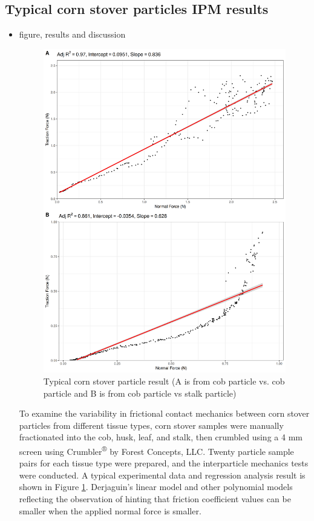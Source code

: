 \documentclass[xcolor=dvipsnames,10pt,hidelinks]{article}
\let\oldsubsection\subsection
\renewcommand{\subsection}{\clearpage\oldsubsection}
\begin{document}
\subsection{Typical corn stover particles IPM results}
\label{sec:orgc09d15c}
\begin{itemize}
\item figure, results and discussion
\label{sec:orga36996c}

\begin{figure}[!htb]
\centering
\includegraphics[width=.9\linewidth]{./figures/typical_result_cs_two_cases.png}
\caption{\label{fig:org97719c9}Typical corn stover particle result (A is from cob particle vs. cob particle and B is from cob particle vs stalk particle)}
\end{figure}

To examine the variability in frictional contact mechanics between corn stover particles from different tissue types, corn stover samples were manually fractionated into the cob, husk, leaf, and stalk, then crumbled using a 4 mm screen using Crumbler\textsuperscript{®} by Forest Concepts, LLC. Twenty particle sample pairs for each tissue type were prepared, and the interparticle mechanics tests were conducted. A typical experimental data and regression analysis result is shown in Figure \ref{fig:org97719c9}.
Derjaguin’s linear model and other polynomial models reflecting the observation of \textcite{sedlak_effect_2017} hinting that friction coefficient values can be smaller when the applied normal force is smaller.
\newpage
\end{itemize}
\end{document}
